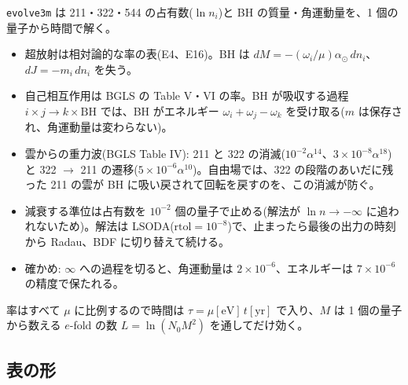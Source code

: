 \texttt{evolve3m} は 211・322・544 の占有数($\ln n_i$)と BH の質量・角運動量を、1 個の量子から時間で解く。
\begin{itemize}
\item 超放射は相対論的な率の表(E4、E16)。BH は $dM=-(\omega_i/\mu)\alpha_\odot\,dn_i$、$dJ=-m_i\,dn_i$ を失う。
\item 自己相互作用は BGLS の Table V・VI の率。BH が吸収する過程 $i\times j\to k\times\mathrm{BH}$ では、BH がエネルギー $\omega_i+\omega_j-\omega_k$ を受け取る($m$ は保存され、角運動量は変わらない)。
\item 雲からの重力波(BGLS Table IV): 211 と 322 の消滅($10^{-2}\alpha^{14}$、$3\times10^{-8}\alpha^{18}$)と 322 $\to$ 211 の遷移($5\times10^{-6}\alpha^{10}$)。自由場では、322 の段階のあいだに残った 211 の雲が BH に吸い戻されて回転を戻すのを、この消滅が防ぐ。
\item 減衰する準位は占有数を $10^{-2}$ 個の量子で止める(解法が $\ln n\to-\infty$ に追われないため)。解法は LSODA($\mathrm{rtol}=10^{-8}$)で、止まったら最後の出力の時刻から Radau、BDF に切り替えて続ける。
\item 確かめ: $\infty$ への過程を切ると、角運動量は $2\times10^{-6}$、エネルギーは $7\times10^{-6}$ の精度で保たれる。
\end{itemize}
率はすべて $\mu$ に比例するので時間は $\tau=\mu[\mathrm{eV}]\,t[\mathrm{yr}]$ で入り、$M$ は 1 個の量子から数える $e$-fold の数 $L=\ln(N_0M^2)$ を通してだけ効く。

\subsection{表の形}

